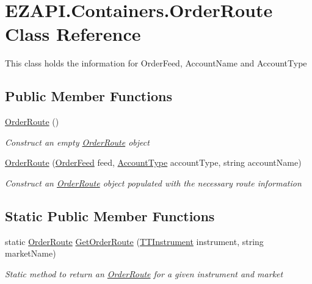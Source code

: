 \hypertarget{class_e_z_a_p_i_1_1_containers_1_1_order_route}{\section{E\-Z\-A\-P\-I.\-Containers.\-Order\-Route Class Reference}
\label{class_e_z_a_p_i_1_1_containers_1_1_order_route}
}


This class holds the information for Order\-Feed, Account\-Name and Account\-Type  


\subsection*{Public Member Functions}
\begin{DoxyCompactItemize}
\item 
\hyperlink{class_e_z_a_p_i_1_1_containers_1_1_order_route_a102cb3ecd04653e006fc1d50d9c14faf}{Order\-Route} ()
\begin{DoxyCompactList}\small\item\em Construct an empty \hyperlink{class_e_z_a_p_i_1_1_containers_1_1_order_route}{Order\-Route} object \end{DoxyCompactList}\item 
\hyperlink{class_e_z_a_p_i_1_1_containers_1_1_order_route_a09e99479692f513a10ec8ae1df7c28b7}{Order\-Route} (\hyperlink{class_e_z_a_p_i_1_1_containers_1_1_order_route_ae275833d711d3350f1793316e37c2a22}{Order\-Feed} feed, \hyperlink{class_e_z_a_p_i_1_1_containers_1_1_order_route_ae21d1fe7a3e0b80092bfdf5321141693}{Account\-Type} account\-Type, string account\-Name)
\begin{DoxyCompactList}\small\item\em Construct an \hyperlink{class_e_z_a_p_i_1_1_containers_1_1_order_route}{Order\-Route} object populated with the necessary route information \end{DoxyCompactList}\end{DoxyCompactItemize}
\subsection*{Static Public Member Functions}
\begin{DoxyCompactItemize}
\item 
static \hyperlink{class_e_z_a_p_i_1_1_containers_1_1_order_route}{Order\-Route} \hyperlink{class_e_z_a_p_i_1_1_containers_1_1_order_route_a002bb6b3e7bb70ed14c96b98b7838cc5}{Get\-Order\-Route} (\hyperlink{class_e_z_a_p_i_1_1_containers_1_1_t_t_instrument}{T\-T\-Instrument} instrument, string market\-Name)
\begin{DoxyCompactList}\small\item\em Static method to return an \hyperlink{class_e_z_a_p_i_1_1_containers_1_1_order_route}{Order\-Route} for a given instrument and market \end{DoxyCompactList}\end{DoxyCompactItemize}
